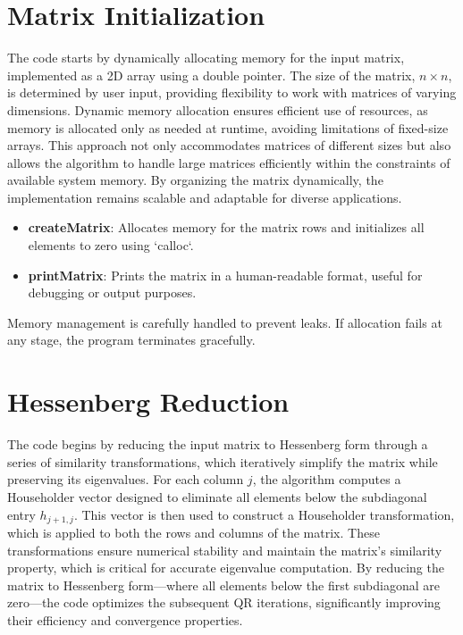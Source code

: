 \documentclass[a4paper,11pt,oneside]{report}
\begin{document}
\section{ Matrix Initialization}
The code starts by dynamically allocating memory for the input matrix, implemented as a 2D array using a double pointer. The size of the matrix, \( n \times n \), is determined by user input, providing flexibility to work with matrices of varying dimensions. Dynamic memory allocation ensures efficient use of resources, as memory is allocated only as needed at runtime, avoiding limitations of fixed-size arrays. This approach not only accommodates matrices of different sizes but also allows the algorithm to handle large matrices efficiently within the constraints of available system memory. By organizing the matrix dynamically, the implementation remains scalable and adaptable for diverse applications.

\begin{itemize}
\item  \textbf{createMatrix}: Allocates memory for the matrix rows and initializes all elements to zero using `calloc`.
\item  \textbf{printMatrix}: Prints the matrix in a human-readable format, useful for debugging or output purposes.
\end{itemize}

Memory management is carefully handled to prevent leaks. If allocation fails at any stage, the program terminates gracefully.

\section{ Hessenberg Reduction}
The code begins by reducing the input matrix to Hessenberg form through a series of similarity transformations, which iteratively simplify the matrix while preserving its eigenvalues. For each column \( j \), the algorithm computes a Householder vector designed to eliminate all elements below the subdiagonal entry \( h_{j+1,j} \). This vector is then used to construct a Householder transformation, which is applied to both the rows and columns of the matrix. These transformations ensure numerical stability and maintain the matrix's similarity property, which is critical for accurate eigenvalue computation. By reducing the matrix to Hessenberg form—where all elements below the first subdiagonal are zero—the code optimizes the subsequent QR iterations, significantly improving their efficiency and convergence properties.
\end{document}
